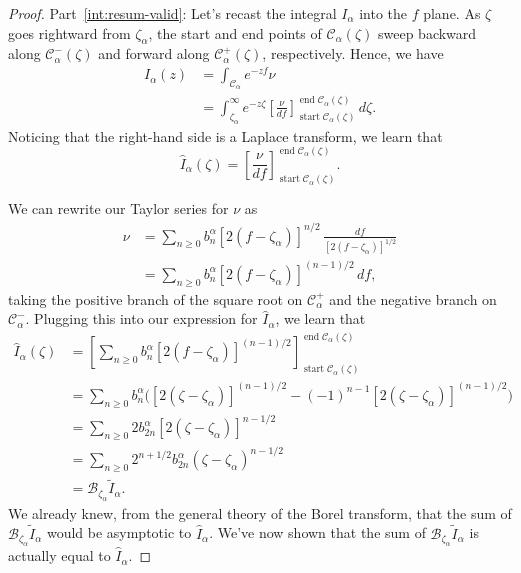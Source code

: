 \documentclass[11pt,a4paper,twoside,leqno,noamsfonts]{amsart}
\numberwithin{equation}{section}
\begin{document}
\begin{proof}
Part~\eqref{int:resum-valid}: Let's recast the integral $I_\alpha$ into the $f$ plane. As $\zeta$ goes rightward from $\zeta_\alpha$, the start and end points of $\mathcal{C}_\alpha(\zeta)$ sweep backward along $\mathcal{C}^-_\alpha(\zeta)$ and forward along $\mathcal{C}^+_\alpha(\zeta)$, respectively. Hence, we have
\begin{align*}
I_\alpha(z) & = \int_{\mathcal{C}_{\alpha}} e^{-zf} \nu \\
& = \int_{\zeta_\alpha}^\infty e^{-z\zeta} \left[\frac{\nu}{df}\right]_{\operatorname{start} \mathcal{C}_\alpha(\zeta)}^{\operatorname{end} \mathcal{C}_\alpha(\zeta)}\,d\zeta.
\end{align*}
Noticing that the right-hand side is a Laplace transform, we learn that
\begin{equation}\label{thimble-difference}
\hat{I}_\alpha(\zeta) = \left[\frac{\nu}{df}\right]_{\operatorname{start} \mathcal{C}_\alpha(\zeta)}^{\operatorname{end} \mathcal{C}_\alpha(\zeta)}.
\end{equation}

We can rewrite our Taylor series for $\nu$ as
\begin{align*}
\nu & = \sum_{n \ge 0} b_n^\alpha [2(f - \zeta_\alpha)]^{n/2}\,\frac{df}{[2(f - \zeta_\alpha)]^{1/2}} \\
& = \sum_{n \ge 0} b_n^\alpha [2(f - \zeta_\alpha)]^{(n - 1)/2}\,df,
\end{align*}
taking the positive branch of the square root on $\mathcal{C}^+_\alpha$ and the negative branch on $\mathcal{C}^-_\alpha$. Plugging this into our expression for $\hat{I}_\alpha$, we learn that
\begin{align*}
\hat{I}_\alpha(\zeta) & = \left[ \sum_{n \ge 0} b_n^\alpha [2(f - \zeta_\alpha)]^{(n - 1)/2} \right]_{\operatorname{start} \mathcal{C}_\alpha(\zeta)}^{\operatorname{end} \mathcal{C}_\alpha(\zeta)} \\
& = \sum_{n \ge 0} b_n^\alpha \Big( [2(\zeta - \zeta_\alpha)]^{(n - 1)/2} - (-1)^{n-1}[2(\zeta - \zeta_\alpha)]^{(n - 1)/2} \Big) \\
& = \sum_{n \ge 0} 2 b_{2n}^\alpha [2(\zeta - \zeta_\alpha)]^{n - 1/2} \\
& = \sum_{n \ge 0} 2^{n+1/2} b_{2n}^\alpha (\zeta - \zeta_\alpha)^{n - 1/2} \\
& = \mathcal{B}_{\zeta_\alpha} \tilde{I}_\alpha.
\end{align*}
We already knew, from the general theory of the Borel transform, that the sum of $\mathcal{B}_{\zeta_\alpha} \tilde{I}_\alpha$ would be asymptotic to $\hat{I}_\alpha$. We've now shown that the sum of $\mathcal{B}_{\zeta_\alpha} \tilde{I}_\alpha$ is actually equal to $\hat{I}_\alpha$.


\end{proof}
\end{document}
